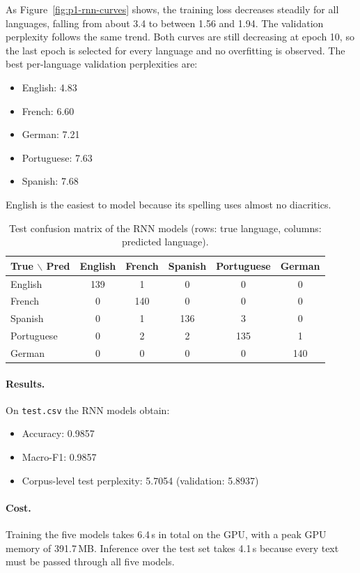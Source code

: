 \documentclass[11pt,a4paper]{article}
\begin{document}
As Figure~\ref{fig:p1-rnn-curves} shows, the training loss decreases
steadily for all languages, falling from about 3.4 to between 1.56 and
1.94. The validation perplexity follows the same trend. Both curves are
still decreasing at epoch 10, so the last epoch is selected for every
language and no overfitting is observed. The best per-language
validation perplexities are:
\begin{itemize}
    \item English: 4.83
    \item French: 6.60
    \item German: 7.21
    \item Portuguese: 7.63
    \item Spanish: 7.68
\end{itemize}
English is the easiest to model because its spelling uses almost no
diacritics.

\begin{table}[H]
    \centering
    \caption{Test confusion matrix of the RNN models (rows: true language,
    columns: predicted language).}
    \label{tab:p1-rnn-cm}
    \begin{tabular}{lccccc}
        \toprule
        True $\backslash$ Pred & English & French & Spanish & Portuguese & German\\
        \midrule
        English    & 139 & 1   & 0   & 0   & 0\\
        French     & 0   & 140 & 0   & 0   & 0\\
        Spanish    & 0   & 1   & 136 & 3   & 0\\
        Portuguese & 0   & 2   & 2   & 135 & 1\\
        German     & 0   & 0   & 0   & 0   & 140\\
        \bottomrule
    \end{tabular}
\end{table}

\paragraph{Results.}
On \texttt{test.csv} the RNN models obtain:
\begin{itemize}
    \item Accuracy: 0.9857
    \item Macro-F1: 0.9857
    \item Corpus-level test perplexity: 5.7054 (validation: 5.8937)
\end{itemize}

\paragraph{Cost.}
Training the five models takes 6.4\,s in total on the GPU, with a peak
GPU memory of 391.7\,MB. Inference over the test set takes 4.1\,s
because every text must be passed through all five models.
\end{document}
